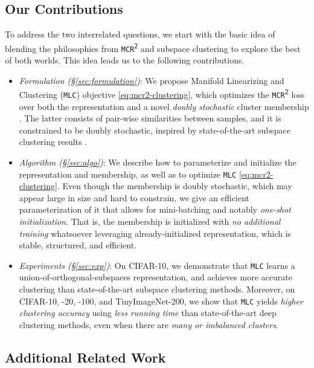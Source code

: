 \documentclass[10pt,twocolumn,letterpaper]{article}
\newcommand{\ours}{MLC}
\newcommand{\mours}{\texttt{\ours}}
\newcommand{\mcr}{\texttt{MCR\textsuperscript{2}}}
\begin{document}
\subsection{Our Contributions}
To address the two interrelated questions, we start with the basic idea of blending the philosophies from \mcr{} and subspace clustering to explore the best of both worlds. This idea leads us to the following contributions.
   \begin{itemize}
       \item \textit{Formulation (\S \ref{sec:formulation})}: We propose Manifold Linearizing and Clustering (\mours) objective \eqref{eq:mcr2-clustering}, which optimizes the \mcr{} loss over both the representation and a novel \textit{doubly stochastic} cluster membership . The latter consists of pair-wise similarities between samples, and it is constrained to be doubly stochastic, inspired by state-of-the-art subspace clustering results \cite{Lim2020-sh,Ding2022-zd}.
       
       \item \textit{Algorithm (\S \ref{sec:algo})}: We describe how to parameterize and initialize the representation and membership, as well as to optimize \mours{} \eqref{eq:mcr2-clustering}. Even though the membership is doubly stochastic, which may appear large in size and hard to constrain, we give an efficient parameterization of it that allows for mini-batching and notably \textit{one-shot initialization}. That is, the membership is initialized with \textit{no additional training} whatsoever leveraging already-initialized representation, which is stable, structured, and efficient. 
        
       \item \textit{Experiments (\S \ref{sec:exp})}: On CIFAR-10, we demonstrate that \mours{} learns a union-of-orthogonal-subspaces representation, and achieves more accurate clustering than state-of-the-art subspace clustering methods. Moreover, on CIFAR-10, -20, -100, and TinyImageNet-200, we show that \mours{} yields \textit{higher clustering accuracy} using \textit{less running time} than state-of-the-art deep clustering methods, even when there are \textit{many or imbalanced clusters}.
\end{itemize}

\subsection{Additional Related Work} \label{sec:related-work}
\end{document}

